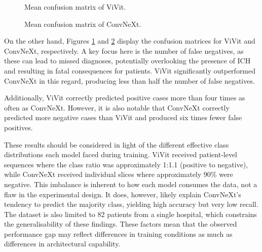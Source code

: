 \begin{figure}[h]
    \centering
    \scalebox{0.7}{}
    \caption{Mean confusion matrix of ViVit.}
    \label{fig:mean_cm_vivit}
\end{figure}

\begin{figure}[h]
    \centering
    \scalebox{0.7}{}
    \caption{Mean confusion matrix of ConvNeXt.}
    \label{fig:mean_cm_ConvNeXt}
\end{figure}

On the other hand, Figures \ref{fig:mean_cm_vivit} and \ref{fig:mean_cm_ConvNeXt} display the confusion matrices for ViVit and ConvNeXt, respectively. A key focus here is the number of false negatives, as these can lead to missed diagnoses, potentially overlooking the presence of ICH and resulting in fatal consequences for patients. ViVit significantly outperformed ConvNeXt in this regard, producing less than half the number of false negatives.

Additionally, ViVit correctly predicted positive cases more than four times as often as ConvNeXt. However, it is also notable that ConvNeXt correctly predicted more negative cases than ViVit and produced six times fewer false positives.

These results should be considered in light of the different effective class distributions each model faced during training. ViVit received patient-level sequences where the class ratio was approximately 1:1.1 (positive to negative), while ConvNeXt received individual slices where approximately 90\% were negative. This imbalance is inherent to how each model consumes the data, not a flaw in the experimental design. It does, however, likely explain ConvNeXt's tendency to predict the majority class, yielding high accuracy but very low recall. The dataset is also limited to 82 patients from a single hospital, which constrains the generalisability of these findings. These factors mean that the observed performance gap may reflect differences in training conditions as much as differences in architectural capability.